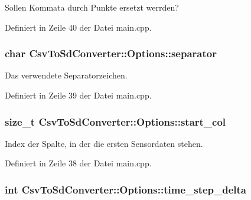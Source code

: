 Sollen Kommata durch Punkte ersetzt werrden? 



Definiert in Zeile 40 der Datei main.\-cpp.

\hypertarget{structCsvToSdConverter_1_1Options_abdcf3a6497aac513eedad80fd85b2f76}{
\subsubsection[{separator}]{\setlength{\rightskip}{0pt plus 5cm}char Csv\-To\-Sd\-Converter\-::\-Options\-::separator}}\label{structCsvToSdConverter_1_1Options_abdcf3a6497aac513eedad80fd85b2f76}


Das verwendete Separatorzeichen. 



Definiert in Zeile 39 der Datei main.\-cpp.

\hypertarget{structCsvToSdConverter_1_1Options_a8d822728dd7c9b03261be6e994fd198c}{
\subsubsection[{start\-\_\-col}]{\setlength{\rightskip}{0pt plus 5cm}size\-\_\-t Csv\-To\-Sd\-Converter\-::\-Options\-::start\-\_\-col}}\label{structCsvToSdConverter_1_1Options_a8d822728dd7c9b03261be6e994fd198c}


Index der Spalte, in der die ersten Sensordaten stehen. 



Definiert in Zeile 38 der Datei main.\-cpp.

\hypertarget{structCsvToSdConverter_1_1Options_ae9cfb41a40de65e8762ffa89c94302bd}{
\subsubsection[{time\-\_\-step\-\_\-delta}]{\setlength{\rightskip}{0pt plus 5cm}int Csv\-To\-Sd\-Converter\-::\-Options\-::time\-\_\-step\-\_\-delta}}\label{structCsvToSdConverter_1_1Options_ae9cfb41a40de65e8762ffa89c94302bd}


